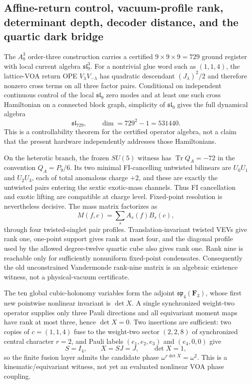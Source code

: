 \subsection{Affine-return control, vacuum-profile rank, determinant depth, decoder distance, and the quartic dark bridge}
\label{sec:20260917-affine-vacuum-magic-decoder-dark15}

The $A_8^3$ order-three construction carries a certified $9\times9\times9=729$ ground register with local current algebra $\mathfrak{sl}_9^3$.  For a nontrivial glue word such as $(1,1,4)$, the lattice-VOA return OPE $V_\lambda V_{-\lambda}$ has quadratic descendant $(J_\lambda)^2/2$ and therefore nonzero cross terms on all three factor pairs.  Conditional on independent continuous control of the local $\mathfrak{sl}_9$ zero modes and at least one such cross Hamiltonian on a connected block graph, simplicity of $\mathfrak{sl}_9$ gives the full dynamical algebra
\[
 \boxed{\mathfrak{sl}_{729}},\qquad \dim=729^2-1=531440.
\]
This is a controllability theorem for the certified operator algebra, not a claim that the present hardware independently addresses those Hamiltonians.

On the heterotic branch, the frozen $SU(5)$ witness has $\operatorname{Tr}Q_A=-72$ in the convention $Q_A=P_9/6$.  Its two minimal FI-cancelling untwisted bilinears are $U_0U_1$ and $U_2U_3$, each of total anomalous charge $+2$, and these are exactly the untwisted pairs entering the sextic exotic-mass channels.  Thus FI cancellation and exotic lifting are compatible at charge level.  Fixed-point resolution is nevertheless decisive.  The mass matrix factorizes as
\[
 M(f,c)=\sum_s A_s(f)B_s(c),
\]
through four twisted-singlet pair profiles.  Translation-invariant twisted VEVs give rank one, one-point support gives rank at most four, and the diagonal profile used by the allowed degree-twelve quartic cube also gives rank one.  Rank nine is reachable only for sufficiently nonuniform fixed-point condensates.  Consequently the old unconstrained Vandermonde rank-nine matrix is an algebraic existence witness, not a physical-vacuum certificate.

The ten global cubic-holonomy variables form the adjoint $\mathfrak{sp}_4(\mathbf F_3)$, whose first new pointwise nonlinear invariant is $\det X$.  A single synchronized weight-two operator supplies only three Pauli directions and all equivariant moment maps have rank at most three, hence $\det X=0$.  Two insertions are sufficient: two copies of $c=(1,1,4)$ fuse to the weight-two sector $(2,2,8)$ of synchronized central character $r=2$, and Pauli labels $(e_1,e_2,e_3)$ and $(e_4,0,0)$ give
\[
 S=I_4,\qquad X=SJ=J,\qquad \det X=1,
\]
so the finite fusion layer admits the candidate phase $\omega^{r\det X}=\omega^2$.  This is a kinematic/equivariant witness, not yet an evaluated nonlinear VOA phase coupling.

